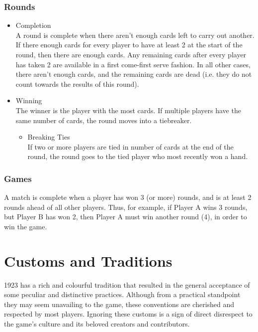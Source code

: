 \documentclass[11pt]{article}
\begin{document}
\subsubsection{Rounds}
\label{sec-2-2-3}
\begin{itemize}

\item Completion\\
\label{sec-2-2-3-1}%
A round is complete when there aren't enough cards left to carry out
another. If there enough cards for every player to have at least
2 at the start of the round, then there are enough cards. Any remaining 
cards after every player has taken 2 are available in a first come-first 
serve fashion. In all other cases, there aren't enough cards, and the
remaining cards are dead (i.e. they do not count towards the results of
this round). 


\item Winning\\
\label{sec-2-2-3-2}%
The winner is the player with the most cards. If multiple players have
the same number of cards, the round moves into a tiebreaker. 




\begin{itemize}

\item Breaking Ties\\
\label{sec-2-2-3-2-1}%
If two or more players are tied in number of cards at the end of the 
round, the round goes to the tied player who most recently won a hand.

\end{itemize} %
\end{itemize} %
\subsubsection{Games}
\label{sec-2-2-4}


A match is complete when a player has won 3 (or more) rounds, and is at
least 2 rounds ahead of all other players. Thus, for example, if Player A 
wins 3 rounds, but Player B has won 2, then Player A must win another round
(4), in order to win the game.
\section{Customs and Traditions}
\label{sec-3}


1923 has a rich and colourful tradition that resulted in the general acceptance
of some peculiar and distinctive practices. Although from a practical standpoint
they may seem unavailing to the game, these conventions are cherished and
respected by most players. Ignoring these customs is a sign of direct disrespect 
to the game's culture and its beloved creators and contributors.
\end{document}
